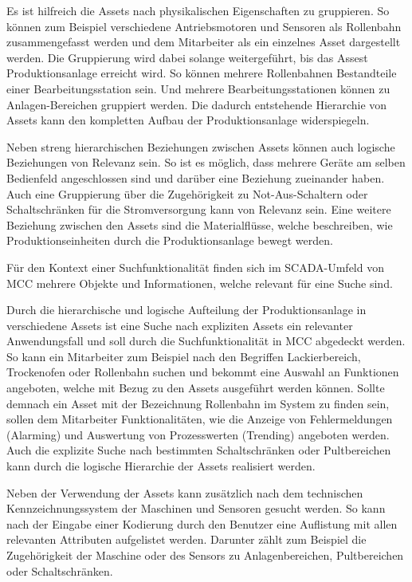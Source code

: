 \begin{description}
    Es ist hilfreich die Assets nach physikalischen Eigenschaften zu gruppieren. So können zum Beispiel verschiedene Antriebsmotoren und Sensoren als \glqq Rollenbahn\grqq{} zusammengefasst werden und dem Mitarbeiter als ein einzelnes Asset dargestellt werden. Die Gruppierung wird dabei solange weitergeführt, bis das Assest \glqq Produktionsanlage\grqq{} erreicht wird. So können mehrere \glqq Rollenbahnen\grqq{} Bestandteile einer \glqq Bearbeitungsstation\grqq{} sein. Und mehrere \glqq Bearbeitungsstationen\grqq{} können zu \glqq Anlagen-Bereichen\grqq{} gruppiert werden. Die dadurch entstehende Hierarchie von Assets kann den kompletten Aufbau der Produktionsanlage widerspiegeln.

    Neben streng hierarchischen Beziehungen zwischen Assets können auch logische Beziehungen von Relevanz sein. So ist es möglich, dass mehrere Geräte am selben Bedienfeld angeschlossen sind und darüber eine Beziehung zueinander haben. Auch eine Gruppierung über die Zugehörigkeit zu Not-Aus-Schaltern oder Schaltschränken für die Stromversorgung kann von Relevanz sein. Eine weitere Beziehung zwischen den Assets sind die Materialflüsse, welche beschreiben, wie Produktionseinheiten durch die Produktionsanlage bewegt werden.
\end{description}

Für den Kontext einer Suchfunktionalität finden sich im SCADA-Umfeld von MCC mehrere Objekte und Informationen, welche relevant für eine Suche sind.

Durch die hierarchische und logische Aufteilung der Produktionsanlage in verschiedene Assets ist eine Suche nach expliziten Assets ein relevanter Anwendungsfall und soll durch die Suchfunktionalität in MCC abgedeckt werden. So kann ein Mitarbeiter zum Beispiel nach den Begriffen \glqq Lackierbereich\grqq{}, \glqq Trockenofen\grqq{} oder \glqq Rollenbahn\grqq{} suchen und bekommt eine Auswahl an Funktionen angeboten, welche mit Bezug zu den Assets ausgeführt werden können. Sollte demnach ein Asset mit der Bezeichnung \glqq Rollenbahn\grqq{} im System zu finden sein, sollen dem Mitarbeiter Funktionalitäten, wie die Anzeige von Fehlermeldungen (Alarming) und Auswertung von Prozesswerten (Trending) angeboten werden. Auch die explizite Suche nach bestimmten Schaltschränken oder Pultbereichen kann durch die logische Hierarchie der Assets realisiert werden.

Neben der Verwendung der Assets kann zusätzlich nach dem technischen Kennzeichnungssystem der Maschinen und Sensoren gesucht werden. So kann nach der Eingabe einer Kodierung durch den Benutzer eine Auflistung mit allen relevanten Attributen aufgelistet werden. Darunter zählt zum Beispiel die Zugehörigkeit der Maschine oder des Sensors zu Anlagenbereichen, Pultbereichen oder Schaltschränken.

